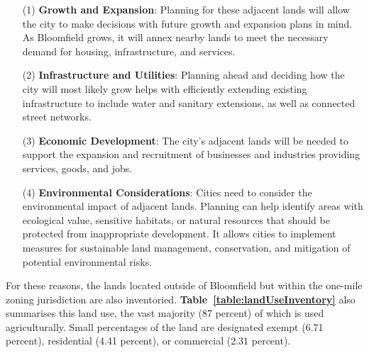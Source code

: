 \begin{itemize}
    \item [(1)] \textbf{Growth and Expansion}: Planning for these adjacent lands will allow the city to make decisions with future growth and expansion plans in mind. As Bloomfield grows, it will annex nearby lands to meet the necessary demand for housing, infrastructure, and services.
    \item [(2)] \textbf{Infrastructure and Utilities}: Planning ahead and deciding how the city will most likely grow helps with efficiently extending existing infrastructure to include water and sanitary extensions, as well as connected street networks.
    \item [(3)] \textbf{Economic Development}: The city's adjacent lands will be needed to support the expansion and recruitment of businesses and industries providing services, goods, and jobs.
    \item [(4)] \textbf{Environmental Considerations}: Cities need to consider the environmental impact of adjacent lands. Planning can help identify areas with ecological value, sensitive habitats, or natural resources that should be protected from inappropriate development. It allows cities to implement measures for sustainable land management, conservation, and mitigation of potential environmental risks.
\end{itemize}

\noindent For these reasons, the lands located outside of Bloomfield but within the one-mile zoning jurisdiction are also inventoried. \textbf{Table~\ref{table:landUseInventory}} also summarises this land use, the vast majority (87 percent) of which is used agriculturally. Small percentages of the land are designated exempt (6.71 percent), residential (4.41 percent), or commercial (2.31 percent).

\newpage
\thispagestyle{empty}
\begin{landscape}
    
\end{landscape}